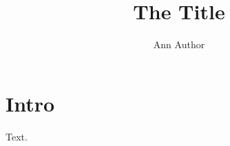 \documentclass[man]{apa6}
\title{The Title}
\author{Ann Author}
\affiliation{First University}
\begin{document}
\maketitle
\section{Intro}
Text.
\end{document}

